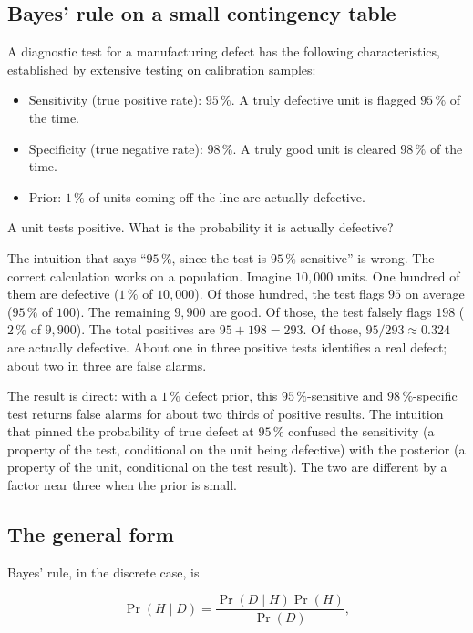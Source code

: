 \subsection{Bayes' rule on a small contingency table}

A diagnostic test for a manufacturing defect has the following
characteristics, established by extensive testing on calibration
samples:

\begin{itemize}[leftmargin=*]
  \item Sensitivity (true positive rate): $95 \,\%$. A truly
    defective unit is flagged $95 \,\%$ of the time.
  \item Specificity (true negative rate): $98 \,\%$. A truly good
    unit is cleared $98 \,\%$ of the time.
  \item Prior: $1 \,\%$ of units coming off the line are actually
    defective.
\end{itemize}

A unit tests positive. What is the probability it is actually
defective?

The intuition that says ``$95 \,\%$, since the test is $95 \,\%$
sensitive'' is wrong. The correct calculation works on a population.
Imagine $10{,}000$ units. One hundred of them are defective
($1 \,\%$ of $10{,}000$). Of those hundred, the test flags $95$ on
average ($95 \,\%$ of $100$). The remaining $9{,}900$ are good. Of
those, the test falsely flags $198$ ($2 \,\%$ of $9{,}900$). The
total positives are $95 + 198 = 293$. Of those, $95/293 \approx
0.324$ are actually defective. About one in three positive tests
identifies a real defect; about two in three are false alarms.

The result is direct: with a $1 \,\%$ defect prior, this $95 \,\%$-sensitive
and $98 \,\%$-specific test returns false alarms for about two
thirds of positive results. The intuition
that pinned the probability of true defect at $95 \,\%$ confused the
sensitivity (a property of the test, conditional on the unit being
defective) with the posterior (a property of the unit, conditional
on the test result). The two are different by a factor near three
when the prior is small.

\subsection{The general form}

Bayes' rule, in the discrete case, is

\[
\Pr(H \mid D) =
\frac{\Pr(D \mid H) \Pr(H)}{\Pr(D)},
\]

